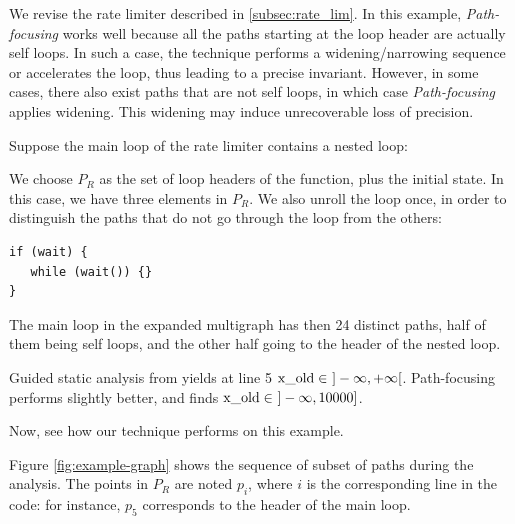 \documentclass[preprint]{sigplanconf}
\begin{document}
We revise the rate limiter described in \ref{subsec:rate_lim}. In this example,
\emph{Path-focusing} works well because all the paths starting at the
loop header are actually self loops. In such a case, the technique performs a
widening/narrowing sequence or accelerates the loop, thus leading to a precise
invariant. However, in some cases, there also exist paths that are not
self loops, in which case \emph{Path-focusing} applies widening. 
This widening may induce unrecoverable loss of precision.

Suppose the main loop of the rate limiter contains a nested loop:


We choose $P_R$ as the set of loop headers of the function, plus the initial
state. In this case, we have three elements in $P_R$.
We also unroll the loop once, in order to distinguish the paths that do not go
through the loop from the others:
\begin{lstlisting}[numbers=none]
if (wait) {
   while (wait()) {}
}
\end{lstlisting}

The main loop in the expanded multigraph has then 24 distinct paths, half of
them being self loops, and the other half going to the header of the nested loop.

Guided static analysis from \citet{DBLP:conf/sas/GopanR07} yields at line 5
$\lstinline|x_old| \in~]-\infty,+\infty[$.
Path-focusing \citep{Monniaux_Gonnord_SAS11} performs slightly
better, and finds $\lstinline|x_old| \in~]-\infty,10000]$.

Now, see how our technique performs on this example.

Figure \ref{fig:example-graph} shows the sequence of subset of paths during the
analysis. The points in $P_R$ are noted $p_i$, where $i$ is the corresponding
line in the code: for instance, $p_5$ corresponds to the header of the main
loop.
\end{document}
